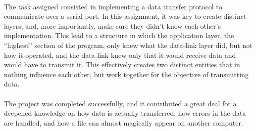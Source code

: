 \documentclass[11pt]{article}
\begin{document}
\paragraph{}The task assigned consisted in implementing a data transfer protocol to communicate over a serial
port. In this assignment, it was key to create distinct layers, and, more importantly, make sure they didn't
know each other's implementation. This lead to a structure in which the application layer, the ``highest''
section of the program, only knew what the data-link layer did, but not how it operated, and the data-link
knew only that it would receive data and would have to transmit it. This effectively creates two distinct
entities that in nothing influence each other, but work together for the objective of transmitting data.

\paragraph{}The project was completed successfully, and it contributed a great deal for a deepened knowledge
on how data is actually transferred, how errors in the data are handled, and how a file can almost magically
appear on another computer.
\end{document}
